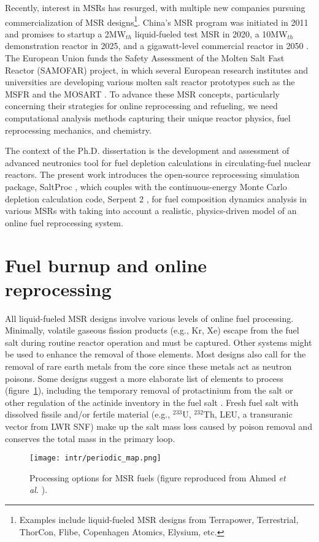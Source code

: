 Recently, interest in \glspl{MSR} has resurged, with multiple new companies 
pursuing commercialization of \gls{MSR} designs\footnote{Examples include 
liquid-fueled \gls{MSR} designs from Terrapower, Terrestrial, ThorCon, Flibe, 
Copenhagen Atomics, Elysium, etc.}. China's \gls{MSR} program was initiated in 
2011 and promises to startup a 2MW$_{th}$ liquid-fueled test \gls{MSR} in 
2020, a 10MW$_{th}$ demonstration reactor in 2025, and a gigawatt-level 
commercial reactor in 2050 \cite{zhang_review_2018}. The European 
Union funds the Safety Assessment of the Molten Salt Fast Reactor 
(SAMOFAR) project, in which several European research institutes and 
universities are developing various molten salt reactor prototypes 
such as the \gls{MSFR} \cite{fiorina_molten_2013} and the \gls{MOSART} 
\cite{ignatiev_molten_2014}. To advance these \gls{MSR} concepts, particularly 
concerning their strategies for online reprocessing and refueling, we need 
computational analysis methods capturing their unique reactor 
physics, fuel reprocessing mechanics, and chemistry.

The context of the Ph.D. dissertation is the development and assessment of 
advanced neutronics tool for fuel depletion calculations in circulating-fuel 
nuclear reactors. The present work introduces the open-source reprocessing 
simulation package, SaltProc \cite{rykhlevskii_arfc/saltproc_2018}, which 
couples with the continuous-energy Monte Carlo depletion calculation code, 
Serpent 2 \cite{leppanen_serpent_2014}, for fuel composition dynamics analysis 
in various \glspl{MSR} with taking into account a realistic, physics-driven
model of an online fuel reprocessing system.

\section{Fuel burnup and online reprocessing}\label{sec:litreview}
All liquid-fueled \gls{MSR} designs involve various levels of online fuel 
processing. Minimally, volatile gaseous fission products (e.g., Kr, Xe) 
escape from the fuel salt during routine reactor operation and must be 
captured. Other systems might be used to enhance the removal of those 
elements. Most designs also call for the removal of rare earth metals from 
the core since these metals act as neutron poisons. Some designs suggest a 
more elaborate list of elements to process (figure~\ref{fig:periodic_tab}), 
including the temporary removal of protactinium from the salt or other 
regulation of the actinide inventory in the fuel salt 
\cite{ahmad_neutronics_2015}. Fresh fuel salt with dissolved fissile and/or 
fertile material (e.g., $^{233}$U, $^{232}$Th, \gls{LEU}, a transuranic 
vector from \gls{LWR} \gls{SNF}) make up the salt mass loss caused by poison 
removal and conserves the total mass in the primary loop.
\begin{figure}[htp!] %
	\centering
	\texttt{[image: intr/periodic\_map.png]}
	\caption{Processing options for \gls{MSR} fuels (figure reproduced from 
		Ahmed \emph{et al.} \cite{ahmad_neutronics_2015}).}
	\label{fig:periodic_tab}
\end{figure}

